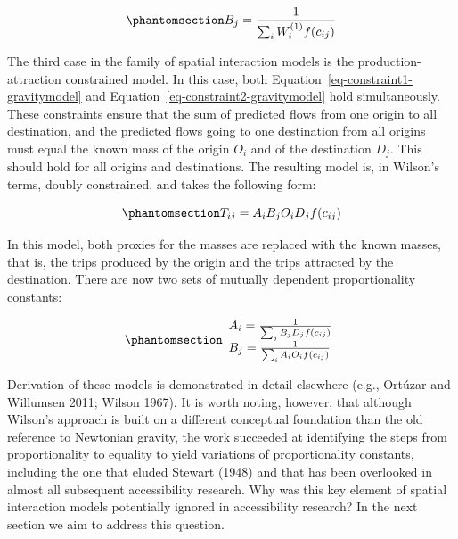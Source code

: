 \documentclass[
]{article}
\begin{document}
\begin{equation}\phantomsection\label{eq-attraction-constrained-balancing-factor}{
B_j = \frac{1}{\sum_i W_i^{(1)} f(c_{ij})}
}\end{equation}

The third case in the family of spatial interaction models is the
production-attraction constrained model. In this case, both
Equation~\ref{eq-constraint1-gravitymodel} and
Equation~\ref{eq-constraint2-gravitymodel} hold simultaneously. These
constraints ensure that the sum of predicted flows from one origin to
all destination, and the predicted flows going to one destination from
all origins must equal the known mass of the origin \(O_i\) and of the
destination \(D_j\). This should hold for all origins and destinations.
The resulting model is, in Wilson's terms, doubly constrained, and takes
the following form:

\begin{equation}\phantomsection\label{eq-doubly-constrained-gravitymodel}{
T_{ij} = A_i B_j O_i D_j f(c_{ij})
}\end{equation}

In this model, both proxies for the masses are replaced with the known
masses, that is, the trips produced by the origin and the trips
attracted by the destination. There are now two sets of mutually
dependent proportionality constants:

\begin{equation}\phantomsection\label{eq-doubly-constrained-balancing-factors}{
\begin{array}{l}
A_i = \frac{1}{\sum_j B_j D_j f(c_{ij})}\\
B_j = \frac{1}{\sum_i A_i O_i f(c_{ij})}
\end{array}
}\end{equation}

Derivation of these models is demonstrated in detail elsewhere (e.g.,
Ortúzar and Willumsen 2011; Wilson 1967). It is worth noting, however,
that although Wilson's approach is built on a different conceptual
foundation than the old reference to Newtonian gravity, the work
succeeded at identifying the steps from proportionality to equality to
yield variations of proportionality constants, including the one that
eluded Stewart (1948) and that has been overlooked in almost all
subsequent accessibility research. Why was this key element of spatial
interaction models potentially ignored in accessibility research? In the
next section we aim to address this question.
\end{document}
